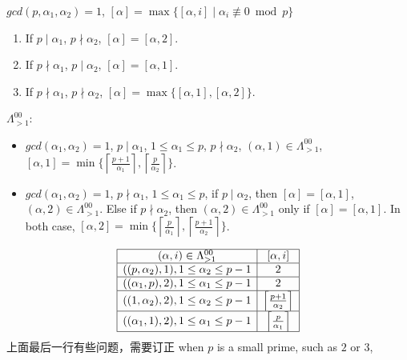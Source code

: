$gcd(p,\alpha_1,\alpha_2)=1$, $[\alpha]=\max\{[\alpha,i]\mid  \alpha_i  \not\equiv 0 \bmod p\}$
\begin{enumerate}
	\item If $p\mid \alpha_1$, $p\nmid \alpha_2$, $[\alpha]=[\alpha,2]$.
	\item If $p\nmid \alpha_1$, $p\mid \alpha_2$, $[\alpha]=[\alpha,1]$.
	\item If $p\nmid \alpha_1$, $p\nmid \alpha_2$, $[\alpha]=\max\{[\alpha,1],[\alpha,2]\}$.
\end{enumerate}
$\Lambda_{>1}^{00}$: 
\begin{itemize}
	\item $gcd(\alpha_1,\alpha_2)=1$, $p\mid \alpha_1$, $1\leq \alpha_1\leq p$, $p\nmid \alpha_2$, $(\alpha,1)\in \Lambda_{>1}^{00}$, $[\alpha,1]=\min\{\left \lceil \frac{p+1}{\alpha_1} \right \rceil, \left \lceil \frac{p}{\alpha_2} \right \rceil \}$.
	\item $gcd(\alpha_1,\alpha_2)=1$, $p\nmid \alpha_1$, $1\leq \alpha_1\leq p$, if $p \mid \alpha_2$, then $[\alpha]=[\alpha,1]$, $(\alpha,2)\in \Lambda_{>1}^{00}$. Else if $p \nmid \alpha_2$, then  $(\alpha,2)\in \Lambda_{>1}^{00}$ only if $[\alpha]=[\alpha,1]$. In both case, $[\alpha,2]=\min\{\left \lceil \frac{p}{\alpha_1} \right \rceil, \left \lceil \frac{p+1}{\alpha_2} \right \rceil \}$.
\end{itemize}
\[\begin{array}{|c|c|}
	\hline	
	(\alpha,i)\in \Lambda_{>1}^{00} & [\alpha,i]\\
	\hline
	((p,\alpha_2),1), 1\leq \alpha_2\leq p-1 &2\\
	\hline
	((\alpha_1,p),2), 1\leq \alpha_1\leq p-1 &2\\
	\hline
	((1,\alpha_2),2), 1\leq \alpha_2\leq p-1 & \left \lceil \frac{p+1}{\alpha_2} \right \rceil\\
	\hline
	((\alpha_1,1),2), 1\leq \alpha_1\leq p-1 & \left \lceil \frac{p}{\alpha_1} \right \rceil\\
	\hline
\end{array}\]
{\color{red}上面最后一行有些问题，需要订正}
when $p$ is a small prime, such as $2$ or $3$,

